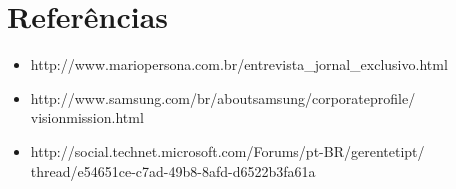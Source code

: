 \documentclass[11pt]{article}
\begin{document}
\section{Referências}
\begin{itemize}
	\item http://www.mariopersona.com.br/entrevista\_jornal\_exclusivo.html 
	\item http://www.samsung.com/br/aboutsamsung/corporateprofile/\\visionmission.html 
	\item http://social.technet.microsoft.com/Forums/pt-BR/gerentetipt/\\thread/e54651ce-c7ad-49b8-8afd-d6522b3fa61a 
\end{itemize}
\end{document}
